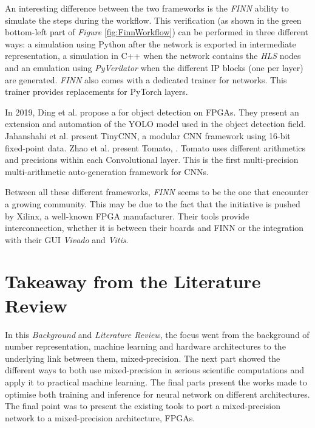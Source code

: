 An interesting difference between the two frameworks is the \emph{FINN} ability to simulate the steps during the workflow. This verification (as shown in the green bottom-left part of \emph{Figure} \ref{fig:FinnWorkflow}) can be performed in three different ways: a simulation using Python after the network is exported in intermediate representation, a simulation in C++ when the network contains the \emph{HLS} nodes and an emulation using \emph{PyVerilator} when the different IP blocks (one per layer) are generated. \emph{FINN} also comes with a dedicated trainer for networks. This trainer provides  replacements for PyTorch layers.

In 2019, Ding et al. \cite{Ding2019} propose a  for object detection on FPGAs. They present an extension and automation of the YOLO model used in the object detection field. Jahanshahi et al. \cite{Jahanshahi2019} present TinyCNN, a modular CNN framework using 16-bit fixed-point data. Zhao et al. \cite{Zhao2019} present Tomato, . Tomato uses different arithmetics and precisions within each Convolutional layer. This is the first multi-precision multi-arithmetic auto-generation framework for CNNs.

Between all these different frameworks, \emph{FINN} seems to be the one that encounter a growing community. This may be due to the fact that the initiative is pushed by Xilinx, a well-known FPGA manufacturer. Their tools provide interconnection, whether it is between their boards and FINN or the integration with their GUI \emph{Vivado} and \emph{Vitis}.


\section{Takeaway from the Literature Review}
In this \emph{Background} and \emph{Literature Review}, the focus went from the background of number representation, machine learning and hardware architectures to the underlying link between them, mixed-precision. The next part showed the different ways to both use mixed-precision in serious scientific computations and apply it to practical machine learning. The final parts present the works made to optimise both training and inference for neural network on different architectures. The final point was to present the existing tools to port a mixed-precision network to a  mixed-precision architecture, FPGAs.

